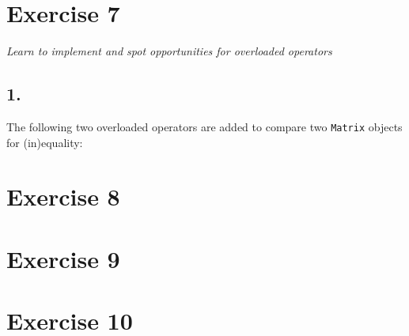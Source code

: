 \documentclass[12pt]{article}
\newcommand{\desc}[1]{\textit{#1} \vspace{1em}}
\begin{document}
\clearpage
\section*{Exercise 7}
\desc{Learn to implement and spot opportunities for overloaded operators}
\subsection*{1.}
The following two overloaded operators are added to compare two \texttt{Matrix} objects for (in)equality:





\clearpage
\section*{Exercise 8}
\desc{}

\clearpage
\section*{Exercise 9}
\desc{}

\clearpage
\section*{Exercise 10}
\desc{}

\clearpage
\end{document}
